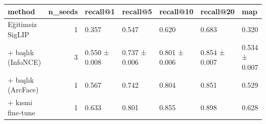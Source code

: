 \begin{tabular}{lrlllll}
\toprule
method & n\_seeds & recall@1 & recall@5 & recall@10 & recall@20 & map \\
\midrule
Eğitimsiz SigLIP & 1 & 0.357 & 0.547 & 0.620 & 0.683 & 0.320 \\
+ başlık (InfoNCE) & 3 & 0.550 ± 0.008 & 0.737 ± 0.006 & 0.801 ± 0.006 & 0.854 ± 0.007 & 0.534 ± 0.007 \\
+ başlık (ArcFace) & 1 & 0.567 & 0.742 & 0.804 & 0.851 & 0.529 \\
+ kısmi fine-tune & 1 & 0.633 & 0.801 & 0.855 & 0.898 & 0.628 \\
\bottomrule
\end{tabular}
